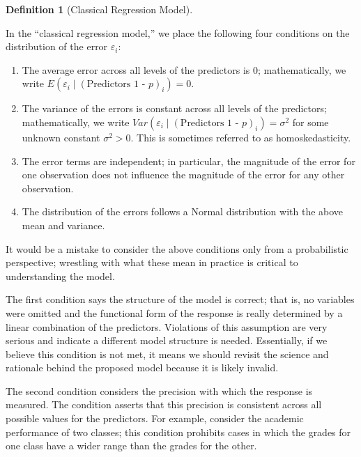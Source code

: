 \documentclass[
  letterpaper,
  DIV=11,
  numbers=noendperiod]{scrreprt}
\providecommand{\tightlist}{%
  \setlength{\itemsep}{0pt}\setlength{\parskip}{0pt}}\usepackage{longtable,booktabs,array}
\theoremstyle{definition}
\theoremstyle{definition}
\newtheorem{definition}{Definition}[chapter]
\theoremstyle{remark}
\begin{document}
\begin{definition}[Classical Regression
Model]\protect\hypertarget{def-classical-regression}{}\label{def-classical-regression}

In the ``classical regression model,'' we place the following four
conditions on the distribution of the error \(\varepsilon_i\):

\begin{enumerate}
\def\labelenumi{\arabic{enumi}.}
\tightlist
\item
  The average error across all levels of the predictors is 0;
  mathematically, we write
  \(E\left(\varepsilon_i \mid (\text{Predictors 1 - }p)_i\right) = 0\).
\item
  The variance of the errors is constant across all levels of the
  predictors; mathematically, we write
  \(Var\left(\varepsilon_i \mid (\text{Predictors 1 - }p)_i\right) = \sigma^2\)
  for some unknown constant \(\sigma^2 > 0\). This is sometimes referred
  to as homoskedasticity.
\item
  The error terms are independent; in particular, the magnitude of the
  error for one observation does not influence the magnitude of the
  error for any other observation.
\item
  The distribution of the errors follows a Normal distribution with the
  above mean and variance.
\end{enumerate}

\end{definition}

It would be a mistake to consider the above conditions only from a
probabilistic perspective; wrestling with what these mean in practice is
critical to understanding the model.

The first condition says the structure of the model is correct; that is,
no variables were omitted and the functional form of the response is
really determined by a linear combination of the predictors. Violations
of this assumption are very serious and indicate a different model
structure is needed. Essentially, if we believe this condition is not
met, it means we should revisit the science and rationale behind the
proposed model because it is likely invalid.

The second condition considers the precision with which the response is
measured. The condition asserts that this precision is consistent across
all possible values for the predictors. For example, consider the
academic performance of two classes; this condition prohibits cases in
which the grades for one class have a wider range than the grades for
the other.
\end{document}
